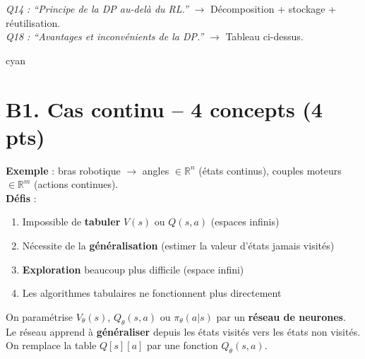\documentclass[11pt,a4paper]{article}
\newcommand{\R}{\mathbb{R}}
\begin{document}
\begin{exambox}
\textit{Q14 : ``Principe de la DP au-delà du RL.''} $\to$ Décomposition + stockage + réutilisation.\\
\textit{Q18 : ``Avantages et inconvénients de la DP.''} $\to$ Tableau ci-dessus.
\end{exambox}

\newpage

\begin{tierbox}{cyan}
\end{tierbox}

\section{B1. Cas continu -- 4 concepts (4 pts)}

\begin{formbox}
\textbf{Exemple} : bras robotique $\to$ angles $\in \R^n$ (états continus), couples moteurs $\in \R^m$ (actions continues).\\[4pt]
\textbf{Défis} :
\begin{enumerate}[nosep]
\item Impossible de \textbf{tabuler} $V(s)$ ou $Q(s,a)$ (espaces infinis)
\item Nécessite de la \textbf{généralisation} (estimer la valeur d'états jamais visités)
\item \textbf{Exploration} beaucoup plus difficile (espace infini)
\item Les algorithmes tabulaires ne fonctionnent plus directement
\end{enumerate}
\end{formbox}

\begin{formbox}
On paramétrise $V_\theta(s)$, $Q_\theta(s,a)$ ou $\pi_\theta(a|s)$ par un \textbf{réseau de neurones}.\\
Le réseau apprend à \textbf{généraliser} depuis les états visités vers les états non visités.\\
On remplace la table $Q[s][a]$ par une fonction $Q_\theta(s, a)$.
\end{formbox}
\end{document}
